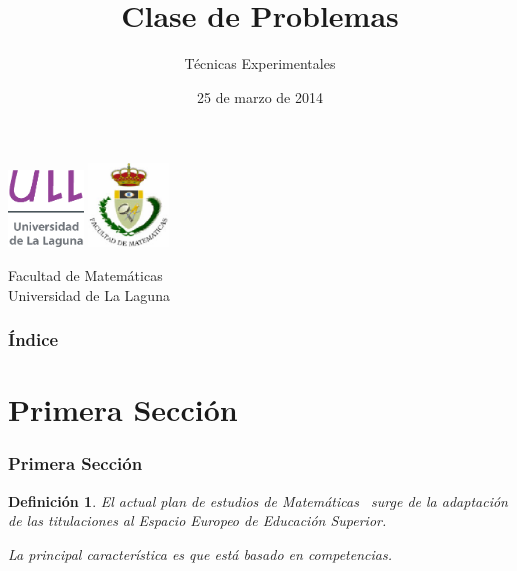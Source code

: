 \documentclass{beamer}
\title[Presentación con Beamer]{Clase de Problemas }
\author[Técnicas Experimentales]{Técnicas Experimentales}
\date[25-03-2014]{25 de marzo de 2014}
\newtheorem{definicion}{Definición}
\begin{document}
  
\begin{frame}

  \includegraphics[width=0.15\textwidth]{img/ullesc}
  \hspace*{7.0cm}
  \includegraphics[width=0.16\textwidth]{img/fmatesc}
  \titlepage

  \begin{small}
    \begin{center}
     Facultad de Matemáticas \\
     Universidad de La Laguna
    \end{center}
  \end{small}

\end{frame}

\begin{frame}
  \frametitle{Índice}  
  \tableofcontents[pausesections]
\end{frame}


\section{Primera Sección}


\begin{frame}

\frametitle{Primera Sección}

\begin{definicion}
El actual plan de estudios de \alert{Matemáticas}~\cite{plan} surge de la adaptación de las 
titulaciones al Espacio Europeo de Educación Superior.

La principal característica es que está basado en competencias. 

\end{definicion}

\end{frame}
\end{document}
